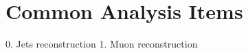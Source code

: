 \chapter{Common Analysis Items}
\label{chapter:CommonAnalysisItems}
0. Jets reconstruction 
1. Muon reconstruction
